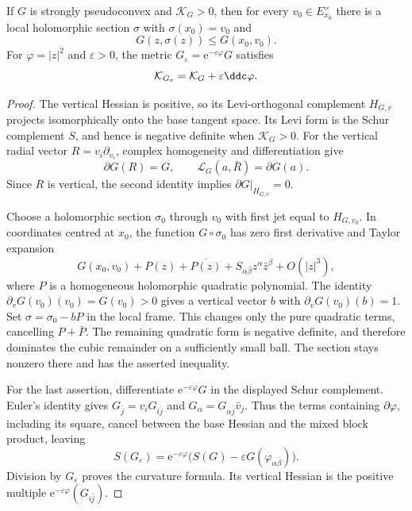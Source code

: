 \begin{lemma}\label{lem:polar-finsler-osculating-section}
If $G$ is strongly pseudoconvex and $\mathcal K_G>0$, then for every $v_0\in E_{x_0}^\times$ there is a local holomorphic section $\sigma$ with $\sigma(x_0)=v_0$ and
\[
 G(z,\sigma(z))\leq G(x_0,v_0).
\]
For $\varphi=|z|^2$ and $\varepsilon>0$, the metric $G_\varepsilon=\mathrm e^{-\varepsilon\varphi}G$ satisfies
\[
 \mathcal K_{G_\varepsilon}=\mathcal K_G+\varepsilon\ddc\varphi.
\]
\end{lemma}
\begin{proof}
The vertical Hessian is positive, so its Levi-orthogonal complement $H_{G,v}$ projects isomorphically onto the base tangent space. Its Levi form is the Schur complement $S$, and hence is negative definite when $\mathcal K_G>0$. For the vertical radial vector $R=v_i\partial_{v_i}$, complex homogeneity and differentiation give
\[
 \partial G(R)=G,\qquad
 \mathcal L_G(a,\bar R)=\partial G(a).
\]
Since $R$ is vertical, the second identity implies $\partial G|_{H_{G,v}}=0$.

Choose a holomorphic section $\sigma_0$ through $v_0$ with first jet equal to $H_{G,v_0}$. In coordinates centred at $x_0$, the function $G\circ\sigma_0$ has zero first derivative and Taylor expansion
\[
 G(x_0,v_0)+P(z)+\overline{P(z)}
 +S_{\alpha\bar\beta}z^\alpha\bar z^\beta+O(|z|^3),
\]
where $P$ is a homogeneous holomorphic quadratic polynomial. The identity $\partial_vG(v_0)(v_0)=G(v_0)>0$ gives a vertical vector $b$ with $\partial_vG(v_0)(b)=1$. Set $\sigma=\sigma_0-bP$ in the local frame. This changes only the pure quadratic terms, cancelling $P+\bar P$. The remaining quadratic form is negative definite, and therefore dominates the cubic remainder on a sufficiently small ball. The section stays nonzero there and has the asserted inequality.

For the last assertion, differentiate $\mathrm e^{-\varepsilon\varphi}G$ in the displayed Schur complement. Euler's identity gives $G_{\bar j}=v_iG_{i\bar j}$ and $G_\alpha=G_{\alpha\bar j}\bar v_j$. Thus the terms containing $\partial\varphi$, including its square, cancel between the base Hessian and the mixed block product, leaving
\[
 S(G_\varepsilon)=\mathrm e^{-\varepsilon\varphi}
       \bigl(S(G)-\varepsilon G(\varphi_{\alpha\bar\beta})\bigr).
\]
Division by $G_\varepsilon$ proves the curvature formula. Its vertical Hessian is the positive multiple $\mathrm e^{-\varepsilon\varphi}(G_{i\bar j})$.
\end{proof}

